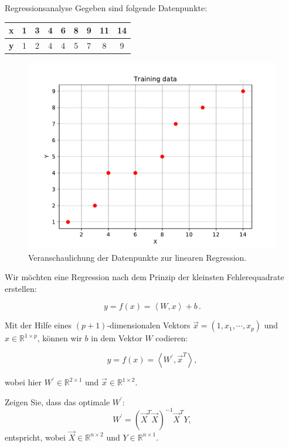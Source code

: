 \begin{task}[credit=7]{Regressionsanalyse}
Gegeben sind folgende Datenpunkte:

\begin{table}[h]
\centering
\begin{tabular}{c|cccccccc}
\toprule
\textbf{x} & 1 & 3 & 4 & 6 & 8 & 9 & 11 & 14 \\ \hline
\textbf{y} & 1 & 2 & 4 & 4 & 5 & 7 & 8  & 9  \\
\bottomrule
\end{tabular}
\end{table}

\begin{figure}[h]
\centering
\caption{Veranschaulichung der Datenpunkte zur linearen Regression.}
\includegraphics[width=0.5\linewidth]{media/images/data.pdf}
\end{figure}

Wir möchten eine Regression nach dem Prinzip der kleinsten Fehlerequadrate erstellen:

\begin{equation}
y =f(x)=\left \langle W, x  \right \rangle+b\,.
\end{equation}

Mit der Hilfe eines $(p+1)$-dimensionalen Vektors $\vec{x}=(1, x_1, \cdots , x_p)$ und $x \in \mathbb{R}^{1 \times p}$, können wir $b$ in dem Vektor $W$ codieren:

\begin{equation}
y =f(x)=\left \langle W^{'}, \vec{x}^{T}  \right \rangle,
\end{equation}

wobei hier $W^{'} \in \mathbb{R}^{2 \times 1}$ und $\vec{x} \in \mathbb{R}^{1 \times 2}$.

\begin{subtask}[title=Herleitung,points=5]
 Zeigen Sie, dass das optimale $W^{'}$:
\begin{equation}
W^{'} =  (\vec{X}^{T}\vec{X})^{-1}\vec{X}^{T}Y,
\end{equation}
entspricht, wobei $\vec{X} \in \mathbb{R}^{n \times 2}$ und $Y \in \mathbb{R}^{n \times 1}$.


\end{subtask}
\end{task}
